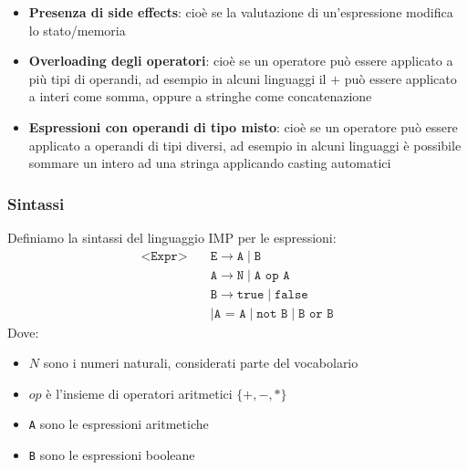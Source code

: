 \documentclass[a4paper]{article}
\begin{document}
\begin{itemize}
\begin{itemize}
\begin{itemize}
          \item Se si valuta prima \texttt{fun(\&a)} e poi \texttt{a}, si avrebbe
            \texttt{b = a + fun(\&a)} e dopo l'esecuzione di \texttt{fun(\&a)}
            si avrebbe \texttt{a = 12} e
            \[
              \texttt{b = 12 + 12 = 24}
            \]
          \end{itemize}
          Quindi l'ordine di valutazione degli operandi può influenzare il
          risultato di un'espressione se ci sono side effects.
      \end{itemize}

    \item \textbf{Presenza di side effects}: cioè se la valutazione di un'espressione
      modifica lo stato/memoria

    \item \textbf{Overloading degli operatori}: cioè se un operatore può essere
      applicato a più tipi di operandi, ad esempio in alcuni linguaggi il \( + \)
      può essere applicato a interi come somma, oppure a stringhe come concatenazione

    \item \textbf{Espressioni con operandi di tipo misto}: cioè se un operatore può
      essere applicato a operandi di tipi diversi, ad esempio in alcuni linguaggi
      è possibile sommare un intero ad una stringa applicando casting automatici
\end{itemize}

\subsubsection{Sintassi}
Definiamo la sintassi del linguaggio IMP per le espressioni:
\[
  \begin{aligned}
    \texttt{<Expr>} \quad &\texttt{E} \to \texttt{A} \mid \texttt{B} \\
                         &\texttt{A} \to \texttt{N} \mid  \texttt{A op A} \\
                         &\texttt{B} \to \texttt{true} \mid \texttt{false} \\
                         &\mid \texttt{A = A} \mid \texttt{not B} \mid \texttt{B or B}
  \end{aligned}
\] 
Dove:
\begin{itemize}
  \item \( N \) sono i numeri naturali, considerati parte del vocabolario
  \item \( op \) è l'insieme di operatori aritmetici \( \{+, -, *\} \)
  \item \texttt{A} sono le espressioni aritmetiche
  \item \texttt{B} sono le espressioni booleane
\end{itemize}
\end{document}
